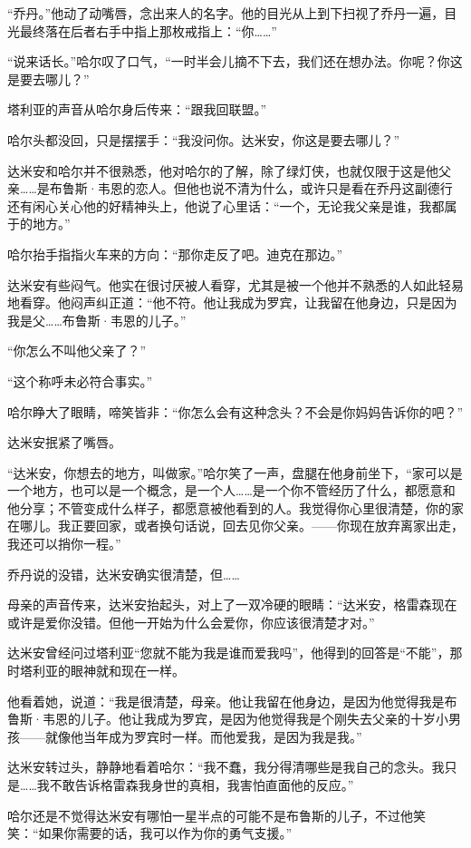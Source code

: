 \documentclass[../main]{subfiles}
\begin{document}
“乔丹。”他动了动嘴唇，念出来人的名字。他的目光从上到下扫视了乔丹一遍，目光最终落在后者右手中指上那枚戒指上：“你……”

“说来话长。”哈尔叹了口气，“一时半会儿摘不下去，我们还在想办法。你呢？你这是要去哪儿？”

塔利亚的声音从哈尔身后传来：“跟我回联盟。”

哈尔头都没回，只是摆摆手：“我没问你。达米安，你这是要去哪儿？”

达米安和哈尔并不很熟悉，他对哈尔的了解，除了绿灯侠，也就仅限于这是他父亲……是布鲁斯·韦恩的恋人。但他也说不清为什么，或许只是看在乔丹这副德行还有闲心关心他的好精神头上，他说了心里话：“一个，无论我父亲是谁，我都属于的地方。”

哈尔抬手指指火车来的方向：“那你走反了吧。迪克在那边。”

达米安有些闷气。他实在很讨厌被人看穿，尤其是被一个他并不熟悉的人如此轻易地看穿。他闷声纠正道：“他不符。他让我成为罗宾，让我留在他身边，只是因为我是父……布鲁斯·韦恩的儿子。”

“你怎么不叫他父亲了？”

“这个称呼未必符合事实。”

哈尔睁大了眼睛，啼笑皆非：“你怎么会有这种念头？不会是你妈妈告诉你的吧？”

达米安抿紧了嘴唇。

“达米安，你想去的地方，叫做家。”哈尔笑了一声，盘腿在他身前坐下，“家可以是一个地方，也可以是一个概念，是一个人……是一个你不管经历了什么，都愿意和他分享；不管变成什么样子，都愿意被他看到的人。我觉得你心里很清楚，你的家在哪儿。我正要回家，或者换句话说，回去见你父亲。——你现在放弃离家出走，我还可以捎你一程。”

乔丹说的没错，达米安确实很清楚，但……

母亲的声音传来，达米安抬起头，对上了一双冷硬的眼睛：“达米安，格雷森现在或许是爱你没错。但他一开始为什么会爱你，你应该很清楚才对。”

达米安曾经问过塔利亚“您就不能为我是谁而爱我吗”，他得到的回答是“不能”，那时塔利亚的眼神就和现在一样。

他看着她，说道：“我是很清楚，母亲。他让我留在他身边，是因为他觉得我是布鲁斯·韦恩的儿子。他让我成为罗宾，是因为他觉得我是个刚失去父亲的十岁小男孩——就像他当年成为罗宾时一样。而他爱我，是因为我是我。”

达米安转过头，静静地看着哈尔：“我不蠢，我分得清哪些是我自己的念头。我只是……我不敢告诉格雷森我身世的真相，我害怕直面他的反应。”

哈尔还是不觉得达米安有哪怕一星半点的可能不是布鲁斯的儿子，不过他笑笑：“如果你需要的话，我可以作为你的勇气支援。”
\end{document}

